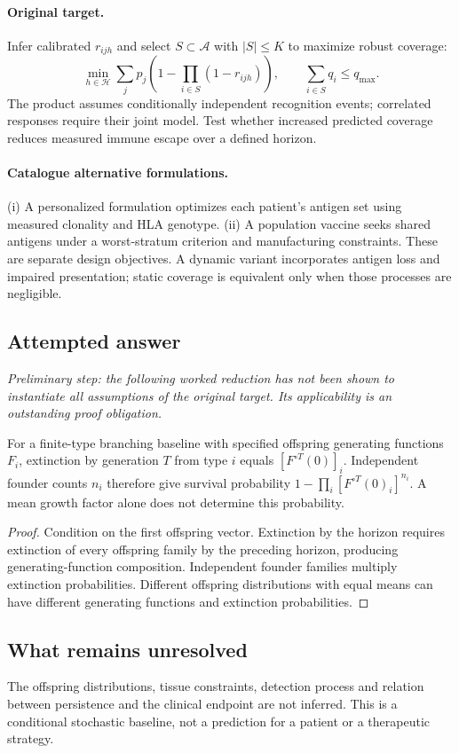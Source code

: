 \documentclass[11pt]{article}
\begin{document}
\paragraph{Original target.}
Infer calibrated $r_{ijh}$ and select $S\subset\mathcal A$ with $|S|\leq K$ to maximize robust coverage:
\[
\min_{h\in\mathcal H}\sum_jp_j\left(1-\prod_{i\in S}(1-r_{ijh})\right),
\qquad \sum_{i\in S}q_i\leq q_{\max}.
\]
The product assumes conditionally independent recognition events; correlated responses require their joint model. Test whether increased predicted coverage reduces measured immune escape over a defined horizon.
\paragraph{Catalogue alternative formulations.}
(i) A personalized formulation optimizes each patient's antigen set using measured clonality and HLA genotype. (ii) A population vaccine seeks shared antigens under a worst-stratum criterion and manufacturing constraints. These are separate design objectives. A dynamic variant incorporates antigen loss and impaired presentation; static coverage is equivalent only when those processes are negligible.
\subsection{Attempted answer}
\noindent\emph{Preliminary step: the following worked reduction has not been shown to instantiate all assumptions of the original target. Its applicability is an outstanding proof obligation.}

\begin{proposition}
For a finite-type branching baseline with specified offspring generating functions $F_i$, extinction by generation $T$ from type $i$ equals $[F^{\circ T}(0)]_i$. Independent founder counts $n_i$ therefore give survival probability $1-\prod_i[F^{\circ T}(0)_i]^{n_i}$. A mean growth factor alone does not determine this probability.
\end{proposition}
\begin{proof}
Condition on the first offspring vector. Extinction by the horizon requires extinction of every offspring family by the preceding horizon, producing generating-function composition. Independent founder families multiply extinction probabilities. Different offspring distributions with equal means can have different generating functions and extinction probabilities.
\end{proof}
\subsection{What remains unresolved}
The offspring distributions, tissue constraints, detection process and relation between persistence and the clinical endpoint are not inferred. This is a conditional stochastic baseline, not a prediction for a patient or a therapeutic strategy.
\end{document}
